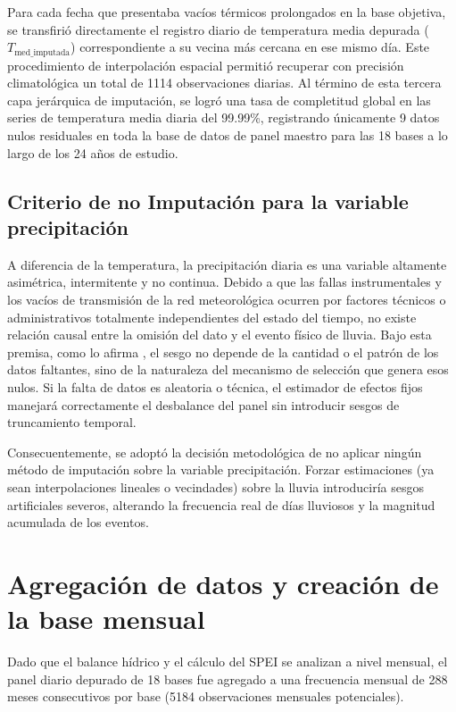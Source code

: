 \begin{enumerate}
Para cada fecha que presentaba vacíos térmicos prolongados en la base objetiva, se transfirió directamente el registro diario de temperatura media depurada ($T_{\text{med\_imputada}}$) correspondiente a su vecina más cercana en ese mismo día. Este procedimiento de interpolación espacial permitió recuperar con precisión climatológica un total de 1114 observaciones diarias. Al término de esta tercera capa jerárquica de imputación, se logró una tasa de completitud global en las series de temperatura media diaria del 99.99\%, registrando únicamente 9 datos nulos residuales en toda la base de datos de panel maestro para las 18 bases a lo largo de los 24 años de estudio.
\end{enumerate}

\subsection{Criterio de no Imputación para la variable precipitación}

A diferencia de la temperatura, la precipitación diaria es una variable altamente asimétrica, intermitente y no continua. Debido a que las fallas instrumentales y los vacíos de transmisión de la red meteorológica ocurren por factores técnicos o administrativos totalmente independientes del estado del tiempo, no existe relación causal entre la omisión del dato y el evento físico de lluvia. Bajo esta premisa, como lo afirma , el sesgo no depende de la cantidad o el patrón de los datos faltantes, sino de la naturaleza del mecanismo de selección que genera esos nulos. Si la falta de datos es aleatoria o técnica, el estimador de efectos fijos manejará correctamente el desbalance del panel sin introducir sesgos de truncamiento temporal.

Consecuentemente, se adoptó la decisión metodológica de no aplicar ningún método de imputación sobre la variable precipitación. Forzar estimaciones (ya sean interpolaciones lineales o vecindades) sobre la lluvia introduciría sesgos artificiales severos, alterando la frecuencia real de días lluviosos y la magnitud acumulada de los eventos.

\section{Agregación de datos y creación de la base mensual}

Dado que el balance hídrico y el cálculo del SPEI se analizan a nivel mensual, el panel diario depurado de 18 bases fue agregado a una frecuencia mensual de 288 meses consecutivos por base (5184 observaciones mensuales potenciales). 


